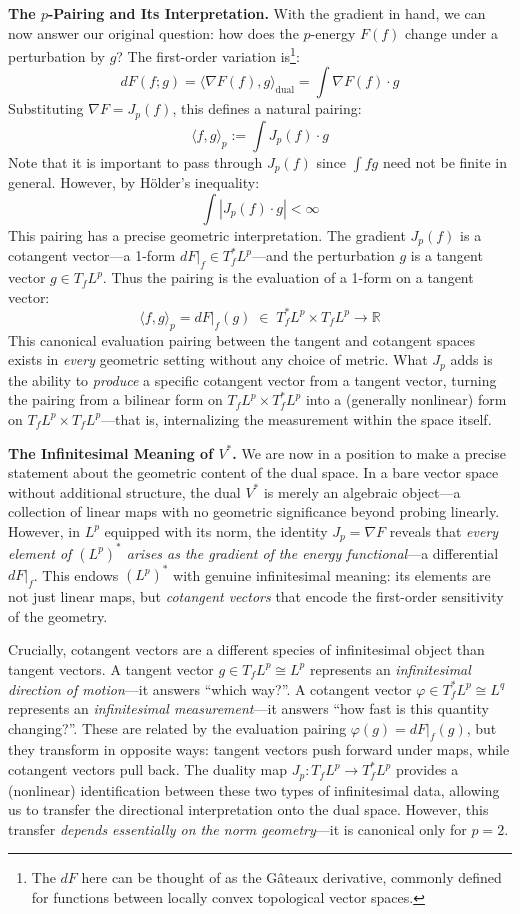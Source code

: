\documentclass{article}
\newcommand{\R}{{\mathbb{R}}}
\let\temp\phi
\let\phi\varphi
\let\varphi\temp
\begin{document}
\medskip\noindent\textbf{The $p$-Pairing and Its Interpretation.}\quad
With the gradient in hand, we can now answer our original question: how does the $p$-energy $F(f)$ change under
a perturbation by $g$? The first-order variation is\footnote{The $dF$ here can be thought of as the
G\^ateaux derivative, commonly defined for functions between locally convex topological vector spaces.}:
\[
d F(f; g) = \langle \nabla F(f), g \rangle_{\text{dual}} = \int \nabla F(f) \cdot g
\]
Substituting $\nabla F = J_p(f)$, this defines a natural pairing:
\[
	\langle f,g \rangle_p := \int J_p(f) \cdot g
\]
Note that it is important to pass through $J_p(f)$ since $\int fg$ need not be finite in general. However, by
H\"older's inequality:
\[
	\int |J_p(f) \cdot g| < \infty
\]
This pairing has a precise geometric interpretation. The gradient $J_p(f)$ is a cotangent vector---a 1-form
$dF|_f \in T_f^* L^p$---and the perturbation $g$ is a tangent vector $g \in T_f L^p$. Thus the pairing is the
evaluation of a 1-form on a tangent vector:
\[
	\langle f, g \rangle_p = dF|_f(g) \;\in\; T_f^* L^p \times T_f L^p \to \R
\]
This canonical evaluation pairing between the tangent and cotangent spaces exists in \emph{every} geometric
setting without any choice of metric. What $J_p$ adds is the ability to \emph{produce} a specific cotangent
vector from a tangent vector, turning the pairing from a bilinear form on $T_f L^p \times T_f^* L^p$ into a
(generally nonlinear) form on $T_f L^p \times T_f L^p$---that is, internalizing the measurement within the
space itself.

\medskip\noindent\textbf{The Infinitesimal Meaning of $V^*$.}\quad
We are now in a position to make a precise statement about the geometric content of the dual space. In a bare
vector space without additional structure, the dual $V^*$ is merely an algebraic object---a collection of
linear maps with no geometric significance beyond probing linearly. However, in $L^p$ equipped with its norm,
the identity $J_p = \nabla F$ reveals that \emph{every element of $(L^p)^*$ arises as the gradient of the
energy functional}---a differential $dF|_f$. This endows $(L^p)^*$ with genuine infinitesimal meaning: its
elements are not just linear maps, but \emph{cotangent vectors} that encode the first-order sensitivity of the
geometry.

Crucially, cotangent vectors are a different species of infinitesimal object than tangent vectors. A tangent
vector $g \in T_f L^p \cong L^p$ represents an \emph{infinitesimal direction of motion}---it answers ``which
way?''. A cotangent vector $\phi \in T_f^* L^p \cong L^q$ represents an \emph{infinitesimal
measurement}---it answers ``how fast is this quantity changing?''. These are related by the evaluation pairing
$\phi(g) = dF|_f(g)$, but they transform in opposite ways: tangent vectors push forward under maps, while
cotangent vectors pull back. The duality map $J_p: T_f L^p \to T_f^* L^p$ provides a (nonlinear)
identification between these two types of infinitesimal data, allowing us to transfer the directional
interpretation onto the dual space. However, this transfer \emph{depends essentially on the norm
geometry}---it is canonical only for $p = 2$.
\end{document}
